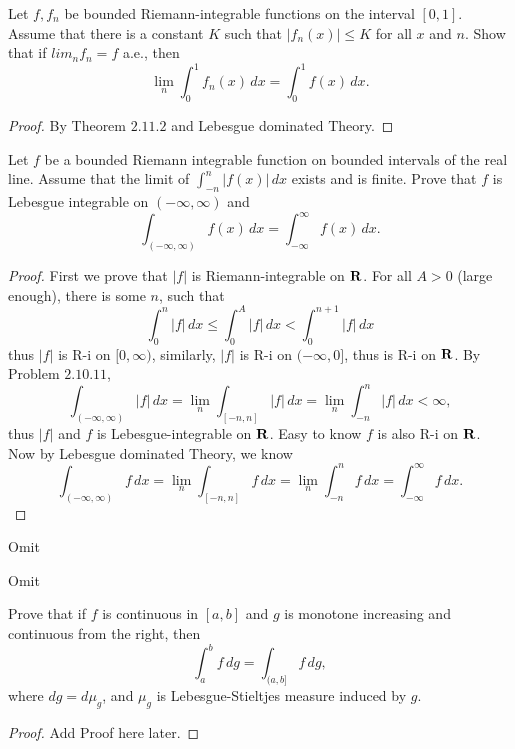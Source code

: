 \begin{pro}%
	Let $f,f_n$ be bounded Riemann-integrable functions on the interval $[0,1]$. Assume that there is a constant $K$ such that $|f_n(x)|\leq K$ for all $x$ and $n$. Show that if $lim_n f_n=f$ a.e., then 
	\[\lim_n \int_0^1 f_n(x)\,dx=\int_0^1 f(x)\,dx.\]
\end{pro}
\begin{proof}
	By Theorem $2.11.2$ and Lebesgue dominated Theory.
\end{proof}

\begin{pro}%
	Let $f$ be a bounded Riemann integrable function on bounded intervals of the real line. Assume that the limit of $\int_{-n}^n |f(x)|\,dx$ exists and is finite. Prove that $f$ is Lebesgue integrable on $(-\infty,\infty)$ and 
	\[\int_{(-\infty,\infty)} f(x)\,dx=\int_{-\infty}^\infty f(x)\,dx.\]
\end{pro}
\begin{proof}
	First we prove that $|f|$ is Riemann-integrable on $\mathbf{R}$. For all $A>0$ (large enough), there is some $n$, such that 
	\[\int_0^n |f|\,dx\leq \int_0^A |f|\,dx<\int_0^{n+1} |f|\,dx\]
	thus $|f|$ is R-i on $[0,\infty)$, similarly, $|f|$ is R-i on $(-\infty,0]$, thus is R-i on $\mathbf{R}$. By Problem $2.10.11$, 
	\[\int_{(-\infty,\infty)} |f|\,dx=\lim_n \int_{[-n,n]} |f|\,dx=\lim_n\int_{-n}^n |f|\,dx<\infty,\]
	thus $|f|$ and $f$ is Lebesgue-integrable on $\mathbf{R}$. Easy to know $f$ is also R-i on $\mathbf{R}$. Now by Lebesgue dominated Theory, we know
	\[\int_{(-\infty,\infty)} f\,dx=\lim_n \int_{[-n,n]}f\,dx=\lim_n \int_{-n}^n f\,dx=\int_{-\infty}^\infty f\,dx.\]
\end{proof}

\begin{pro}%
	Omit
\end{pro}

\begin{pro}%
	Omit
\end{pro}

\begin{pro}%
	Prove that if $f$ is continuous in $[a,b]$ and $g$ is monotone increasing and continuous from the right, then
	\[\int_a^b f\,dg=\int_{(a,b]} f\,dg,\]
	where $dg=d\mu_g$, and $\mu_g$ is Lebesgue-Stieltjes measure induced by $g$.
\end{pro}
\begin{proof}
	Add Proof here later.
\end{proof}

